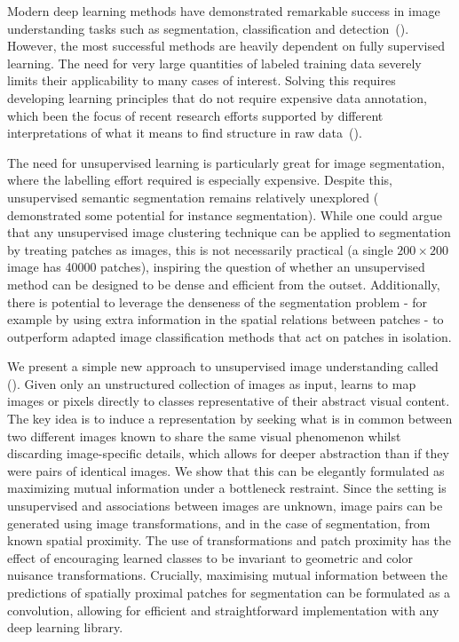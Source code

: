 Modern deep learning methods have demonstrated remarkable success in image understanding tasks such as segmentation, classification and detection~(\cite{girshick2014rich,long2015fully,simonyan2014very}). However, the most successful methods are heavily dependent on fully supervised learning. The need for very large quantities of labeled training data severely limits their applicability to many cases of interest. Solving this requires developing learning principles that do not require expensive data annotation, which been the focus of recent research efforts supported by different interpretations of what it means to find structure in raw data~(\cite{pathak2016context,noroozi2016unsupervised,lee2017unsupervised,chang2017deep}).

The need for unsupervised learning is particularly great for image segmentation, where the labelling effort required is especially expensive. Despite this, unsupervised semantic segmentation remains relatively unexplored (\cite{greff2016tagger} demonstrated some potential for instance segmentation). While one could argue that any unsupervised image clustering technique can be applied to segmentation by treating patches as images, this is not necessarily practical (a single $200 \times 200$ image has 40000 patches), inspiring the question of whether an unsupervised method can be designed to be dense and efficient from the outset. Additionally, there is potential to leverage the denseness of the segmentation problem - for example by using extra information in the spatial relations between patches - to outperform adapted image classification methods that act on patches in isolation.

We present a simple new approach to unsupervised image understanding called \emph{\methodname} (\methodnameshort). Given only an unstructured collection of images as input, \methodnameshort learns to map images or pixels directly to classes representative of their abstract visual content. The key idea is to induce a representation by seeking what is in common between two different images known to share the same visual phenomenon whilst discarding image-specific details, which allows for deeper abstraction than if they were pairs of identical images. We show that this can be elegantly formulated as maximizing mutual information under a bottleneck restraint. Since the setting is unsupervised and associations between images are unknown, image pairs can be generated using image transformations, and in the case of segmentation, from known spatial proximity. The use of transformations and patch proximity has the effect of encouraging learned classes to be invariant to geometric and color nuisance transformations. Crucially, maximising mutual information between the predictions of spatially proximal patches for segmentation can be formulated as a convolution, allowing for efficient and straightforward implementation with any deep learning library.

